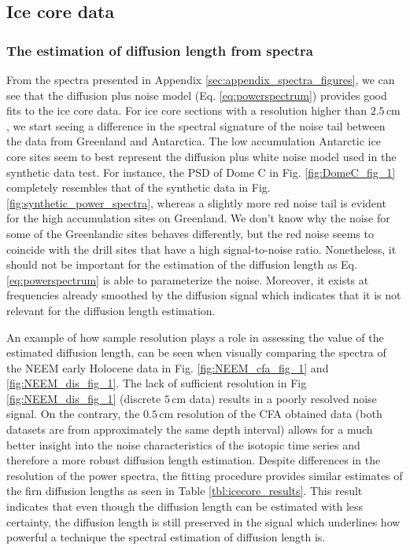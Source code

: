 \documentclass[11pt, draftcls, onecolumn]{IEEEtran} %
\numberwithin{equation}{section}
\numberwithin{table}{section}
\numberwithin{figure}{section}
\begin{document}
\subsection{Ice core data}\label{sec:discussion_icecore}

\subsubsection{The estimation of diffusion length from spectra}

From the spectra presented in Appendix \ref{sec:appendix_spectra_figures}, 
we can see that the diffusion plus noise model (Eq. \ref{eq:powerspectrum}) provides good fits to the ice core data. 
For ice core sections with a resolution higher than $2.5\,\mathrm{cm}$, 
we start seeing a difference in the spectral signature of the noise tail between the data from Greenland and Antarctica.
The low accumulation Antarctic ice core sites seem to best represent the diffusion plus white noise model
used in the synthetic data test.
For instance, the PSD of Dome C in Fig. \ref{fig:DomeC_fig_1} completely resembles that of the synthetic data
in Fig. \ref{fig:synthetic_power_spectra},
whereas a slightly more red noise tail is evident for the high accumulation sites on Greenland. 
We don't know why the noise for some of the Greenlandic sites behaves differently, 
but the red noise seems to coincide with the drill sites that have a high signal-to-noise ratio.
Nonetheless, it should not be important for the estimation of the diffusion length
as Eq. \ref{eq:powerspectrum} is able to parameterize the noise.
Moreover, it exists at frequencies already smoothed by the diffusion signal
which indicates that it is not relevant for the diffusion length estimation.


An example of how sample resolution plays a role in assessing the value of the estimated diffusion length, 
can be seen when visually comparing the spectra of the NEEM early Holocene data in Fig. \ref{fig:NEEM_cfa_fig_1} and \ref{fig:NEEM_dis_fig_1}. 
The lack of sufficient resolution in Fig \ref{fig:NEEM_dis_fig_1} (discrete $5\,\mathrm{cm}$ data) results in a poorly resolved noise signal. 
On the contrary, the $0.5\,\mathrm{cm}$ resolution of the CFA obtained data (both datasets are from approximately the same depth interval) 
allows for a much better insight into the noise characteristics of the isotopic time series and therefore a more robust diffusion length estimation.
Despite differences in the resolution of the power spectra,
the fitting procedure provides similar estimates of the firn diffusion lengths as seen in Table \ref{tbl:icecore_results}.
This result indicates that even though the diffusion length can be estimated with less certainty,
the diffusion length is still preserved in the signal which underlines how powerful a technique the spectral estimation of diffusion length is.
\end{document}
